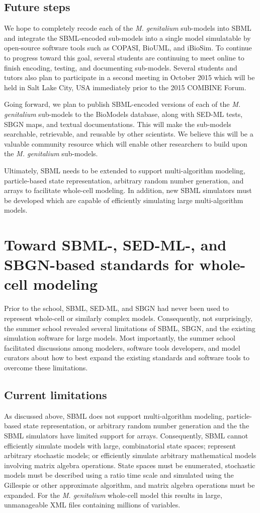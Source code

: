 \documentclass[journal,transmag]{IEEEtran}
\begin{document}
\subsection{Future steps}
We hope to completely recode each of the \textit{M. genitalium} sub-models into SBML and integrate the SBML-encoded sub-models into a single model simulatable by open-source software tools such as COPASI, BioUML, and iBioSim. To continue to progress toward this goal, several students are continuing to meet online to finish encoding, testing, and documenting sub-models. Several students and tutors also plan to participate in a second meeting in October 2015 which will be held in Salt Lake City, USA immediately prior to the 2015 COMBINE Forum.

Going forward, we plan to publish SBML-encoded versions of each of the \textit{M. genitalium} sub-models to the BioModels database, along with SED-ML tests, SBGN maps, and textual documentations. This will make the sub-models searchable, retrievable, and reusable by other scientists. We believe this will be a valuable community resource which will enable other researchers to build upon the \textit{M. genitalium} sub-models.

Ultimately, SBML needs to be extended to support multi-algorithm modeling, particle-based state representation, arbitrary random number generation, and arrays to facilitate whole-cell modeling. In addition, new SBML simulators must be developed which are capable of efficiently simulating large multi-algorithm models.

\section{Toward SBML-, SED-ML-, and SBGN-based standards for whole-cell modeling}
Prior to the school, SBML, SED-ML, and SBGN had never been used to represent whole-cell or similarly complex models. Consequently, not surprisingly, the summer school revealed several limitations of SBML, SBGN, and the existing simulation software for large models. Most importantly, the summer school facilitated discussions among modelers, software tools developers, and model curators about how to best expand the existing standards and software tools to overcome these limitations.

\subsection{Current limitations}
As discussed above, SBML does not support multi-algorithm modeling, particle-based state representation, or arbitrary random number generation and the the SBML simulators have limited support for arrays. Consequently, SBML cannot efficiently simulate models with large, combinatorial state spaces; represent arbitrary stochastic models; or efficiently simulate arbitrary mathematical models involving matrix algebra operations. State spaces must be enumerated, stochastic models must be described using a ratio time scale and simulated using the  Gillespie or other approximate algorithm, and matrix algebra operations must be expanded. For the \textit{M. genitalium} whole-cell model this results in large, unmanageable XML files containing millions of variables.
\end{document}
